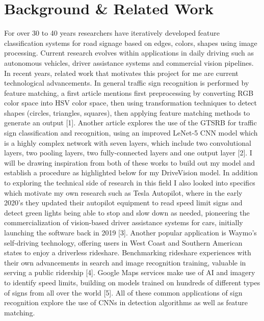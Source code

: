 \documentclass[final]{article}
\begin{document}
\section*{Background & Related Work }
\vspace*{-0.1in}
For over 30 to 40 years researchers have iteratively developed feature classification systems for road signage based on edges, colors, shapes using image processing. Current research evolves within applications in daily driving such as autonomous vehicles, driver assistance systems and commercial vision pipelines. In recent years, related work that motivates this project for me are current technological advancements. In general traffic sign recognition is performed by feature matching, a first article mentions first preprocessing by converting RGB color space into HSV color space, then using transformation techniques to detect shapes (circles, triangles, squares), then applying feature matching methods to generate an output [1]. Another article explores the use of the GTSRB for traffic sign classification and recognition, using an improved LeNet-5 CNN model which is a highly complex network with seven layers, which include two convolutional layers, two pooling layers, two fully-connected layers and one output layer [2]. I will be drawing inspiration from both of these works to build out my model and establish a procedure as highlighted below for my DriveVision model. In addition to exploring the technical side of research in this field I also looked into specifics which motivate my own research such as Tesla Autopilot, where in the early 2020’s they updated their autopilot equipment to read speed limit signs and detect green lights being able to stop and slow down as needed, pioneering the commercialization of vision-based driver assistance systems for cars, initially launching the software back in 2019 [3]. Another popular application is Waymo’s self-driving technology, offering users in West Coast and Southern American states to enjoy a driverless rideshare. Benchmarking rideshare experiences with their own advancements in search and image recognition training, valuable in serving a public ridership [4]. Google Maps services make use of AI and imagery to identify speed limits, building on models trained on hundreds of different types of signs from all over the world [5]. All of these common applications of sign recognition explore the use of CNNs in detection algorithms as well as feature matching. 
\vspace*{-0.2in}
\end{document}
